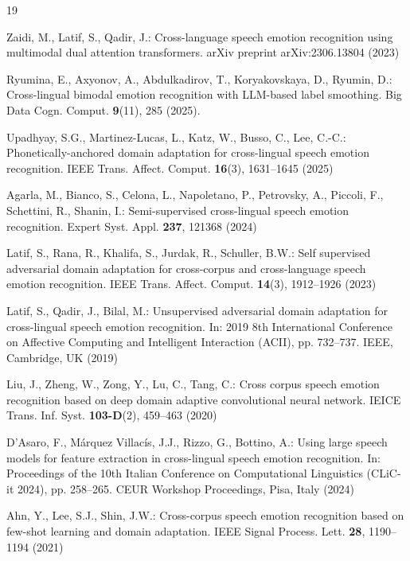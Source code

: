 \documentclass[runningheads]{llncs}
\begin{document}
\begin{thebibliography}{19}

Zaidi, M., Latif, S., Qadir, J.: Cross-language speech emotion recognition using multimodal dual attention transformers. arXiv preprint arXiv:2306.13804 (2023)

Ryumina, E., Axyonov, A., Abdulkadirov, T., Koryakovskaya, D., Ryumin, D.: Cross-lingual bimodal emotion recognition with LLM-based label smoothing. Big Data Cogn. Comput. \textbf{9}(11), 285 (2025). 

Upadhyay, S.G., Martinez-Lucas, L., Katz, W., Busso, C., Lee, C.-C.: Phonetically-anchored domain adaptation for cross-lingual speech emotion recognition. IEEE Trans. Affect. Comput. \textbf{16}(3), 1631--1645 (2025)

Agarla, M., Bianco, S., Celona, L., Napoletano, P., Petrovsky, A., Piccoli, F., Schettini, R., Shanin, I.: Semi-supervised cross-lingual speech emotion recognition. Expert Syst. Appl. \textbf{237}, 121368 (2024)

Latif, S., Rana, R., Khalifa, S., Jurdak, R., Schuller, B.W.: Self supervised adversarial domain adaptation for cross-corpus and cross-language speech emotion recognition. IEEE Trans. Affect. Comput. \textbf{14}(3), 1912--1926 (2023)

Latif, S., Qadir, J., Bilal, M.: Unsupervised adversarial domain adaptation for cross-lingual speech emotion recognition. In: 2019 8th International Conference on Affective Computing and Intelligent Interaction (ACII), pp. 732--737. IEEE, Cambridge, UK (2019)

Liu, J., Zheng, W., Zong, Y., Lu, C., Tang, C.: Cross corpus speech emotion recognition based on deep domain adaptive convolutional neural network. IEICE Trans. Inf. Syst. \textbf{103-D}(2), 459--463 (2020)

D'Asaro, F., M\'{a}rquez Villac\'{i}s, J.J., Rizzo, G., Bottino, A.: Using large speech models for feature extraction in cross-lingual speech emotion recognition. In: Proceedings of the 10th Italian Conference on Computational Linguistics (CLiC-it 2024), pp. 258--265. CEUR Workshop Proceedings, Pisa, Italy (2024)

Ahn, Y., Lee, S.J., Shin, J.W.: Cross-corpus speech emotion recognition based on few-shot learning and domain adaptation. IEEE Signal Process. Lett. \textbf{28}, 1190--1194 (2021)


\end{thebibliography}
\end{document}
